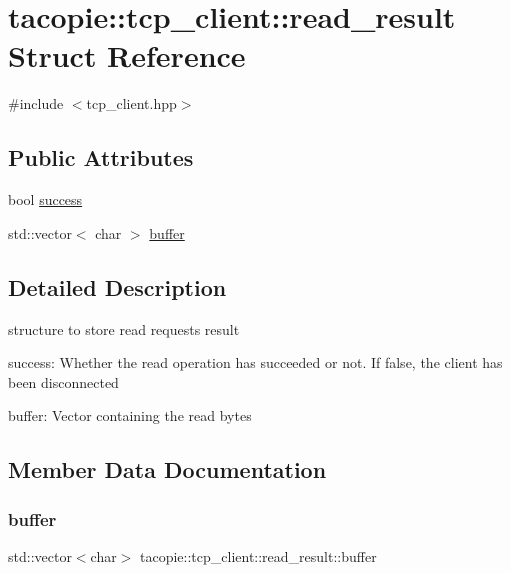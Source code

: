 \hypertarget{structtacopie_1_1tcp__client_1_1read__result}{}\section{tacopie\+:\+:tcp\+\_\+client\+:\+:read\+\_\+result Struct Reference}
\label{structtacopie_1_1tcp__client_1_1read__result}


{\ttfamily \#include $<$tcp\+\_\+client.\+hpp$>$}

\subsection*{Public Attributes}
\begin{DoxyCompactItemize}
\item 
bool \hyperlink{structtacopie_1_1tcp__client_1_1read__result_a9bb917b8d210159a95655a6f8da8e96e}{success}
\item 
std\+::vector$<$ char $>$ \hyperlink{structtacopie_1_1tcp__client_1_1read__result_a50d22ea3a43d085d88d54bbf59a357dc}{buffer}
\end{DoxyCompactItemize}


\subsection{Detailed Description}
structure to store read requests result
\begin{DoxyItemize}
\item success\+: Whether the read operation has succeeded or not. If false, the client has been disconnected
\item buffer\+: Vector containing the read bytes 
\end{DoxyItemize}

\subsection{Member Data Documentation}
\mbox{\label{structtacopie_1_1tcp__client_1_1read__result_a50d22ea3a43d085d88d54bbf59a357dc}} 
\subsubsection{\texorpdfstring{buffer}{buffer}}
{\footnotesize\ttfamily std\+::vector$<$char$>$ tacopie\+::tcp\+\_\+client\+::read\+\_\+result\+::buffer}

